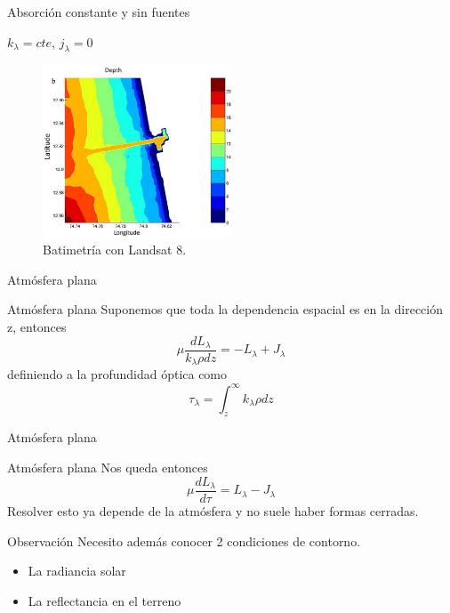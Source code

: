 \documentclass[handout]{beamer}
\begin{document}
\begin{frame}{Absorción constante y sin fuentes}
  \begin{exampleblock}{$k_\lambda = cte$, $j_\lambda = 0$}
    \begin{figure}
    \centering
    \includegraphics[width=0.5\textwidth]{imagenes/bati.png}
      \caption{Batimetría con Landsat 8.}
    \end{figure}
  \end{exampleblock}
\end{frame}

\begin{frame}{Atmósfera plana}
  \begin{exampleblock}{Atmósfera plana}
    Suponemos que toda la dependencia espacial es en la dirección z, entonces
    \begin{equation}
      \mu \frac{dL_\lambda}{k_\lambda \rho dz} = -L_\lambda + J_\lambda
    \end{equation} \pause
    definiendo a la profundidad óptica como
    \begin{equation}
        \tau_\lambda = \int_z^\infty k_\lambda \rho dz
    \end{equation}
  \end{exampleblock}
\end{frame}

\begin{frame}{Atmósfera plana}
  \begin{exampleblock}{Atmósfera plana}
    Nos queda entonces
    \begin{equation}
      \mu \frac{dL_\lambda}{d\tau} = L_\lambda - J_\lambda
    \end{equation}\pause
    Resolver esto ya depende de la atmósfera y no suele haber formas cerradas.
  \end{exampleblock}
  \pause
  \begin{alertblock}{Observación}
    Necesito además conocer 2 condiciones de contorno.
    \begin{itemize}[<+->]
      \item La radiancia solar
      \item La reflectancia en el terreno
    \end{itemize}
  \end{alertblock}
\end{frame}
\end{document}
